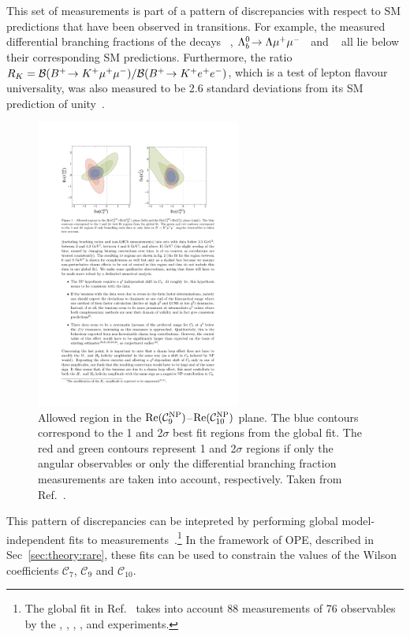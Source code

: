 This set of measurements is part of a pattern of discrepancies with respect to SM predictions that have been observed in \btosmm transitions. For example, the measured differential branching fractions of the decays \BsTophimm~\cite{bsphimm-lhcb}, ${{\Lambda}^0_{b}}\!\rightarrow \Lambda{\ensuremath{\mu^+\mu^-}}$~\cite{lblmm-lhcb} and \BuToKmm~\cite{kmm-lhcb} all lie below their corresponding SM predictions. Furthermore, the ratio $R_{K} = {\mathcal{B}}({{{B}^+}}\!\rightarrow {\ensuremath{{K}^+}}{\ensuremath{\mu^+}}{\ensuremath{\mu^-}})/{\mathcal{B}}({{{B}^+}}\!\rightarrow {\ensuremath{{K}^+}}{\ensuremath{e^+}}{\ensuremath{e^-}})$, which is a test of lepton flavour universality, was also measured to be 2.6 standard deviations from its SM prediction of unity~\cite{rk-lhcb}.

\begin{figure}[!tb]
\centering
\includegraphics[trim={2.5cm 20cm 10.7cm 2.4cm},clip,width=0.6\textwidth]{figs/kpimm/introduction/c9c10.pdf}
\caption{Allowed region in the ${\rm Re}(\mathcal{C}_{9}^{\rm NP})$--${\rm Re}(\mathcal{C}_{10}^{\rm NP})$ plane. The blue contours correspond to the 1 and 2$\sigma$ best fit regions from the global fit. The red and green contours represent 1 and 2$\sigma$ regions if only the \BdToKstmmP angular observables or only the differential branching fraction measurements are taken into account, respectively. Taken from Ref.~\cite{straub}.}
\label{fig:kpimm:c9c10}
\end{figure}

This pattern of discrepancies can be intepreted by performing global model-independent fits to \btosll measurements~\cite{straub}.\footnote{The global fit in Ref.~\cite{straub} takes into account 88 measurements of 76 observables by the \atlas, \babar, \belle, \cdf, \cms and \lhcb experiments.} In the framework of OPE, described in Sec~\ref{sec:theory:rare}, these fits can be used to constrain the values of the Wilson coefficients $\mathcal{C}_{7}$, $\mathcal{C}_{9}$ and $\mathcal{C}_{10}$.

